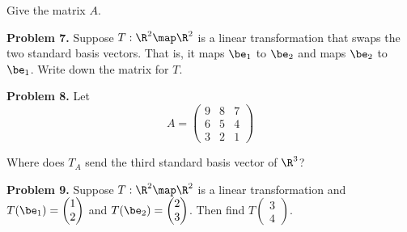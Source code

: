\documentclass[oneside,12pt]{amsart}
\begin{document}
Give the matrix $A$.

\bigskip
\bigskip

\textbf{Problem 7.}  Suppose $T:\R^2\map\R^2$ is a linear transformation
that swaps the two standard basis vectors. That is, it
maps $\be_1$ to $\be_2$ and maps $\be_2$ to $\be_1$. Write down the matrix
for $T$.

\bigskip
\bigskip

\textbf{Problem 8.}  Let
$$
A = \begin{pmatrix}
9 & 8 & 7 \\
6 & 5 & 4 \\
3 & 2 & 1
\end{pmatrix}
$$

Where does $T_A$ send the third standard basis vector of $\R^3$?

\bigskip
\bigskip


\textbf{Problem 9.} Suppose $T:\R^2\map\R^2$ is a linear transformation and
$T(\be_1) = \begin{pmatrix} 1 \\ 2\end{pmatrix}$
and $T(\be_2) = \begin{pmatrix} 2 \\ 3\end{pmatrix}$. Then find
$T\begin{pmatrix} 3 \\ 4\end{pmatrix}$.


\bigskip
\bigskip
\end{document}
